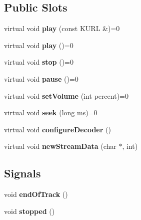 \subsection*{Public Slots}
\begin{CompactItemize}
\item 
virtual void {\bf play} (const KURL \&)=0
\item 
virtual void {\bf play} ()=0
\item 
virtual void {\bf stop} ()=0
\item 
virtual void {\bf pause} ()=0
\item 
virtual void {\bf set\-Volume} (int percent)=0
\item 
virtual void {\bf seek} (long ms)=0
\item 
virtual void {\bf configure\-Decoder} ()
\item 
virtual void {\bf new\-Stream\-Data} (char $\ast$, int)
\end{CompactItemize}
\subsection*{Signals}
\begin{CompactItemize}
\item 
void {\bf end\-Of\-Track} ()
\item 
void {\bf stopped} ()
\end{CompactItemize}
